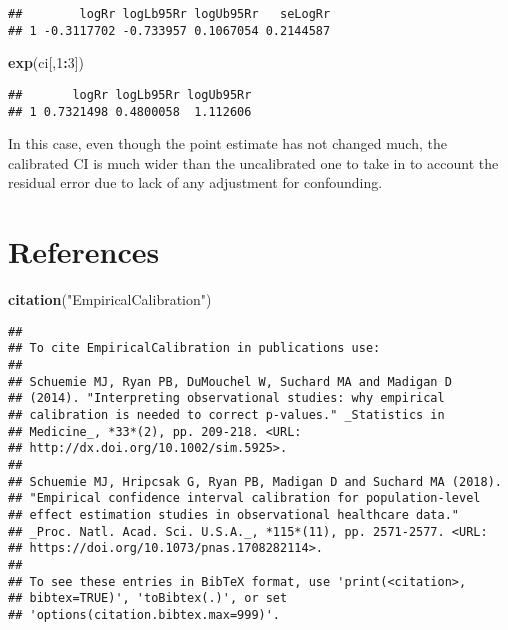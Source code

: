 \documentclass[]{article}
\newenvironment{Shaded}{\begin{snugshade}}{\end{snugshade}}
\newcommand{\DecValTok}[1]{\textcolor[rgb]{0.00,0.00,0.81}{#1}}
\newcommand{\KeywordTok}[1]{\textcolor[rgb]{0.13,0.29,0.53}{\textbf{#1}}}
\newcommand{\NormalTok}[1]{#1}
\newcommand{\OperatorTok}[1]{\textcolor[rgb]{0.81,0.36,0.00}{\textbf{#1}}}
\newcommand{\StringTok}[1]{\textcolor[rgb]{0.31,0.60,0.02}{#1}}
\begin{document}
\begin{verbatim}
##        logRr logLb95Rr logUb95Rr   seLogRr
## 1 -0.3117702 -0.733957 0.1067054 0.2144587
\end{verbatim}

\begin{Shaded}
\begin{Highlighting}[]
\KeywordTok{exp}\NormalTok{(ci[,}\DecValTok{1}\OperatorTok{:}\DecValTok{3}\NormalTok{])}
\end{Highlighting}
\end{Shaded}

\begin{verbatim}
##       logRr logLb95Rr logUb95Rr
## 1 0.7321498 0.4800058  1.112606
\end{verbatim}

In this case, even though the point estimate has not changed much, the
calibrated CI is much wider than the uncalibrated one to take in to
account the residual error due to lack of any adjustment for
confounding.

\hypertarget{references}{%
\section{References}\label{references}}

\begin{Shaded}
\begin{Highlighting}[]
\KeywordTok{citation}\NormalTok{(}\StringTok{"EmpiricalCalibration"}\NormalTok{)}
\end{Highlighting}
\end{Shaded}

\begin{verbatim}
## 
## To cite EmpiricalCalibration in publications use:
## 
## Schuemie MJ, Ryan PB, DuMouchel W, Suchard MA and Madigan D
## (2014). "Interpreting observational studies: why empirical
## calibration is needed to correct p-values." _Statistics in
## Medicine_, *33*(2), pp. 209-218. <URL:
## http://dx.doi.org/10.1002/sim.5925>.
## 
## Schuemie MJ, Hripcsak G, Ryan PB, Madigan D and Suchard MA (2018).
## "Empirical confidence interval calibration for population-level
## effect estimation studies in observational healthcare data."
## _Proc. Natl. Acad. Sci. U.S.A._, *115*(11), pp. 2571-2577. <URL:
## https://doi.org/10.1073/pnas.1708282114>.
## 
## To see these entries in BibTeX format, use 'print(<citation>,
## bibtex=TRUE)', 'toBibtex(.)', or set
## 'options(citation.bibtex.max=999)'.
\end{verbatim}
\end{document}

